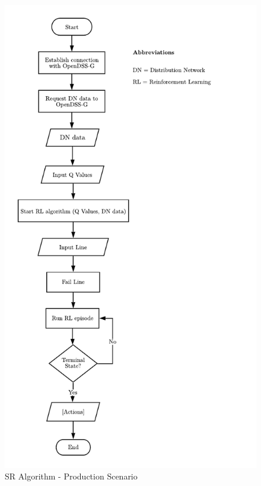 \begin{figure}[!hb]
    \centering
    \includegraphics[scale=0.9]{_chapter1/fig/production_scenario.pdf}
    \caption{SR Algorithm - Production Scenario}
    \label{ch1:fig:production_blocks}
\end{figure}
